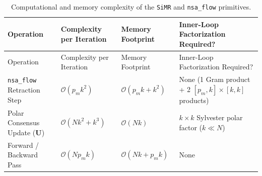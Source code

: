 \documentclass[
  10pt,
  letterpaper,
]{report}
\begin{document}
\begin{longtable}[]{@{}
  >{\raggedright\arraybackslash}p{}
  >{\raggedright\arraybackslash}p{}
  >{\raggedright\arraybackslash}p{}
  >{\raggedright\arraybackslash}p{}@{}}
\caption{Computational and memory complexity of the
\protect\texttt{SiMR} and \protect\texttt{nsa\_flow}
primitives.}\label{tbl-app-complexity}\tabularnewline
\toprule\noalign{}
\begin{minipage}[b]{\linewidth}\raggedright
Operation
\end{minipage} & \begin{minipage}[b]{\linewidth}\raggedright
Complexity per Iteration
\end{minipage} & \begin{minipage}[b]{\linewidth}\raggedright
Memory Footprint
\end{minipage} & \begin{minipage}[b]{\linewidth}\raggedright
Inner-Loop Factorization Required?
\end{minipage} \\
\midrule\noalign{}
\endfirsthead
\toprule\noalign{}
\begin{minipage}[b]{\linewidth}\raggedright
Operation
\end{minipage} & \begin{minipage}[b]{\linewidth}\raggedright
Complexity per Iteration
\end{minipage} & \begin{minipage}[b]{\linewidth}\raggedright
Memory Footprint
\end{minipage} & \begin{minipage}[b]{\linewidth}\raggedright
Inner-Loop Factorization Required?
\end{minipage} \\
\midrule\noalign{}
\endhead
\bottomrule\noalign{}
\endlastfoot
\texttt{nsa\_flow} Retraction Step & \(\mathcal{O}(p_m k^2)\) &
\(\mathcal{O}(p_m k + k^2)\) & None (1 Gram product + 2
\([p_m,k]\times[k,k]\) products) \\
Polar Consensus Update (\(\mathbf{U}\)) & \(\mathcal{O}(N k^2 + k^3)\) &
\(\mathcal{O}(N k)\) & \(k \times k\) Sylvester polar factor
(\(k \ll N\)) \\
Forward / Backward Pass & \(\mathcal{O}(N p_m k)\) &
\(\mathcal{O}(N k + p_m k)\) & None \\
\end{longtable}
\end{document}
